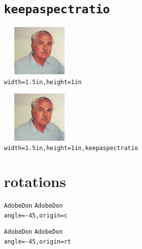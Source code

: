 \documentclass{article}
\begin{document}
\section{\protect\texttt{keepaspectratio}}

\begin{center}
\includegraphics[width=1.5in,height=1in]{graphics/AdobeDon}
\\[1ex]
\texttt{width=1.5in,height=1in}
\end{center}

\begin{center}
\includegraphics[width=1.5in,height=1in,keepaspectratio]{graphics/AdobeDon}
\\[1ex]
\texttt{width=1.5in,height=1in,keepaspectratio}
\end{center}

\newpage

\section{rotations}

\begin{center}
\texttt{AdobeDon} 
\texttt{AdobeDon} \\[1ex]
\texttt{angle=-45,origin=c}
\end{center}

\begin{center}
\texttt{AdobeDon} 
\texttt{AdobeDon} \\[1ex]
\texttt{angle=-45,origin=rt}
\end{center}
\end{document}
